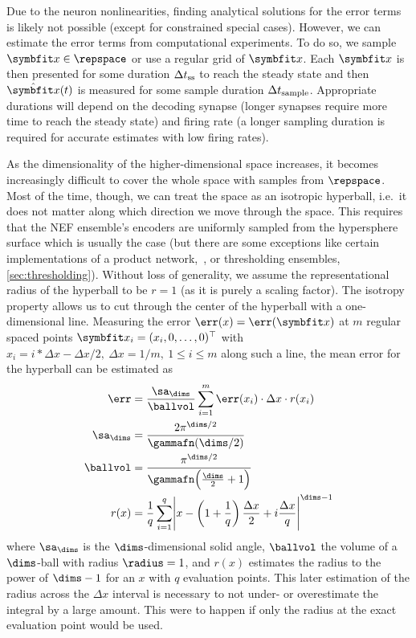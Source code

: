 Due to the neuron nonlinearities, finding analytical solutions for the error terms is likely not possible (except for constrained special cases).
However, we can estimate the error terms from computational experiments.
To do so, we sample $\vc x \in \repspace$ or use a regular grid of $\vc x$.
Each $\vc x$ is then presented for some duration $\Delta t_{{\mathrm{ss}}}$ to reach the steady state and then $\hat{\vc x}(t)$ is measured for some sample duration $\Delta t_{{\mathrm{sample}}}$.
Appropriate durations will depend on the decoding synapse (longer synapses require more time to reach the steady state) and firing rate (a longer sampling duration is required for accurate estimates with low firing rates).

As the dimensionality of the higher-dimensional space increases, it becomes increasingly difficult to cover the whole space with samples from $\repspace$.
Most of the time, though, we can treat the space as an isotropic hyperball, i.e.\ it does not matter along which direction we move through the space.
This requires that the NEF ensemble's encoders are uniformly sampled from the hypersphere surface which is usually the case (but there are some exceptions like certain implementations of a product network,~\cite{gosmann2015-1}, or thresholding ensembles, \cref{sec:thresholding}).
Without loss of generality, we assume the representational radius of the hyperball to be $r = 1$ (as it is purely a scaling factor).
The isotropy property allows us to cut through the center of the hyperball with a one-dimensional line.
Measuring the error $\err(x) = \err(\vc x)$ at $m$ regular spaced points $\vc x_i = (x_i, 0, \dotsc, 0)\Tr$ with $x_i = i * \Delta x - \Delta x/2,\ \Delta x = 1/m,\ 1 \leq i \leq m$ along such a line, the mean error for the hyperball can be estimated as
\begin{align}
    \err &= \frac{\sa_{\dims}}{\ballvol} \sum_{i=1}^{m} \err(x_i) \cdot \Delta x \cdot r(x_i) \\
    \sa_{\dims} &= \frac{2 \pi^{\dims/2}}{\gammafn(\dims/2)} \\
    \ballvol &= \frac{\pi^{\dims/2}}{\gammafn\!\del{\frac{\dims}{2} + 1}} \\
    r(x) &= \frac{1}{q} \sum_{i=1}^{q} \abs{x - \del{1 + \frac{1}{q}} \frac{\Delta x}{2} + i \frac{\Delta x}{q}}^{\dims - 1}
\end{align}
where $\sa_{\dims}$ is the $\dims$-dimensional solid angle, $\ballvol$ the volume of a $\dims$-ball with radius $\radius = 1$, and $r(x)$ estimates the radius to the power of $\dims-1$ for an $x$ with $q$ evaluation points.
This later estimation of the radius across the $\Delta x$ interval is necessary to not under- or overestimate the integral by a large amount.
This were to happen if only the radius at the exact evaluation point would be used.


